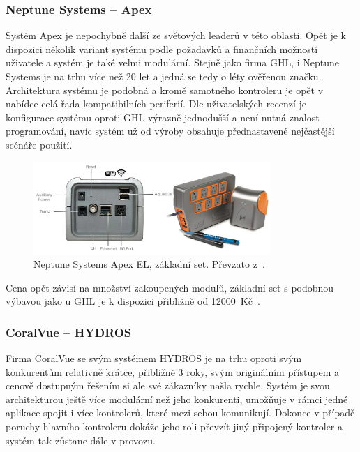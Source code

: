         \subsubsection{Neptune Systems -- Apex}
            Systém Apex je nepochybně další ze světových leaderů v této oblasti. Opět je k dispozici několik variant systému podle požadavků a finančních možností uživatele a systém je také velmi modulární. Stejně jako firma GHL, i Neptune Systems je na trhu více než 20 let a jedná se tedy o léty ověřenou značku. Architektura systému je podobná a kromě samotného kontroleru je opět v nabídce celá řada kompatibilních periferií. Dle uživatelských recenzí je konfigurace systému oproti GHL výrazně jednodušší a není nutná znalost programování, navíc systém už od výroby obsahuje přednastavené nejčastější scénáře použití.

            \begin{figure}[h!]
                \centering
                \includegraphics[width=0.8\textwidth]{obrazky/trh/apex-el.jpg}
                \caption{Neptune Systems Apex EL, základní set. Převzato z~\cite{eshop-neptune-systems-apex}.}
                \label{fig:obrazky-trh-apex-el}
            \end{figure}
            
            Cena opět závisí na množství zakoupených modulů, základní set s podobnou výbavou jako u GHL je k dispozici přibližně od \qty{12000}{Kč}~\cite{neptune-systems-why-apex,eshop-neptune-systems-apex}.

        \subsubsection{CoralVue -- HYDROS}
            Firma CoralVue se svým systémem HYDROS je na trhu oproti svým konkurentům relativně krátce, přibližně 3 roky, svým originálním přístupem a cenově dostupným řešením si ale své zákazníky našla rychle. Systém je svou architekturou ještě více modulární než jeho konkurenti, umožňuje v rámci jedné aplikace spojit i více kontrolerů, které mezi sebou komunikují. Dokonce v případě poruchy hlavního kontroleru dokáže jeho roli převzít jiný připojený kontroler a systém tak zůstane dále v provozu. 
            
